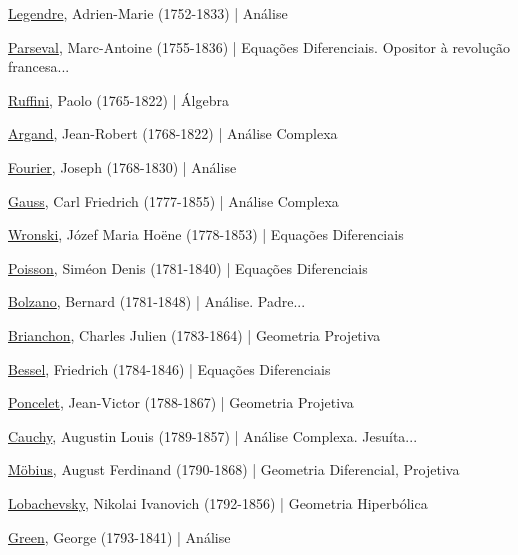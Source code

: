 \documentclass[12pt,a4paper]{article}
\begin{document}
			\href{http://pt.wikipedia.org/wiki/Adrien-Marie_Legendre}{Legendre}, Adrien-Marie (1752-1833) | An\'alise

			\href{http://pt.wikipedia.org/wiki/Marc-Antoine_Parseval}{Parseval}, Marc-Antoine (1755-1836) | Equa\c{c}\~oes Diferenciais. Opositor \`a revolu\c{c}\~ao francesa...

			\href{http://en.wikipedia.org/wiki/Paolo_Ruffini}{Ruffini}, Paolo (1765-1822) | \'Algebra

			\href{http://en.wikipedia.org/wiki/Jean-Robert_Argand}{Argand}, Jean-Robert (1768-1822) | An\'alise Complexa

			\href{http://pt.wikipedia.org/wiki/Jean-Baptiste_Joseph_Fourier}{Fourier}, Joseph (1768-1830) | An\'alise

			\href{http://pt.wikipedia.org/wiki/Carl_Friedrich_Gauss}{Gauss}, Carl Friedrich (1777-1855) | An\'alise Complexa

			\href{http://en.wikipedia.org/wiki/J\%C3\%B3zef_Maria_Hoene-Wro\%C5\%84ski}{Wronski}, J\'ozef Maria Hoëne (1778-1853) | Equa\c{c}\~oes Diferenciais

			\href{http://en.wikipedia.org/wiki/Poisson}{Poisson}, Sim\'eon Denis (1781-1840) | Equa\c{c}\~oes Diferenciais

			\href{http://pt.wikipedia.org/wiki/Bernard_Bolzano}{Bolzano}, Bernard (1781-1848) | An\'alise. Padre...

			\href{http://en.wikipedia.org/wiki/Charles_Julien_Brianchon}{Brianchon}, Charles Julien (1783-1864) | Geometria Projetiva

			\href{http://pt.wikipedia.org/wiki/Friedrich_Wilhelm_Bessel}{Bessel}, Friedrich (1784-1846) | Equa\c{c}\~oes Diferenciais

			\href{http://en.wikipedia.org/wiki/Jean-Victor_Poncelet}{Poncelet}, Jean-Victor (1788-1867) | Geometria Projetiva

			\href{http://pt.wikipedia.org/wiki/Augustin_Louis_Cauchy}{Cauchy}, Augustin Louis (1789-1857) | An\'alise Complexa. Jesu\'ita...

			\href{http://pt.wikipedia.org/wiki/August_Ferdinand_M\%C3\%B6bius}{Möbius}, August Ferdinand (1790-1868) | Geometria Diferencial, Projetiva

			\href{http://pt.wikipedia.org/wiki/Nikolai_Ivanovich_Lobachevsky}{Lobachevsky}, Nikolai Ivanovich (1792-1856) | Geometria Hiperb\'olica

			\href{http://pt.wikipedia.org/wiki/George_Green}{Green}, George (1793-1841) | An\'alise
\end{document}
